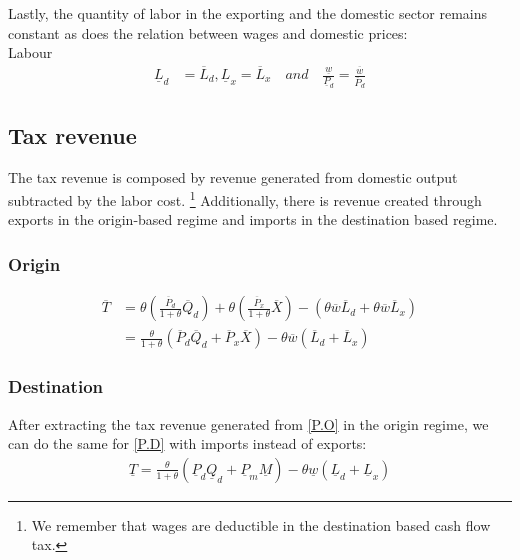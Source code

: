 Lastly, the quantity of labor in the exporting and the domestic sector remains constant as does the relation between wages and domestic prices: \\
\noindent Labour
\begin{equation}\label{P.L}
\begin{aligned}
\underline L_d &= \overline L_d, \underline L_x = \overline L_x \quad and \quad \frac{\underline w}{\underline P_d} = \frac{\overline w}{\overline P_d}
\end{aligned}
\end{equation}

\subsection*{Tax revenue}
The tax revenue is composed by revenue generated from domestic output subtracted by the labor cost. \footnote{We remember that wages are deductible in the destination based cash flow tax.} Additionally, there is revenue created through exports in the origin-based regime and imports in the destination based regime.  
\subsubsection*{Origin} 
\begin{equation}\label{t.o}
\begin{aligned}
\overline T &= \theta \left(\frac{\overline P_d}{1+\theta}\overline Q_d \right ) + \theta \left(\frac{\overline P_x}{1+\theta}\overline X\right ) - \left( \theta \overline w \overline L_d + \theta \overline w \overline L_x\right ) \\ &= \frac{\theta}{1+\theta} \left(  \overline P_d \overline Q_d +  \overline P_x \overline X \right)  - \theta \overline w  \left( \overline L_d + \overline L_x \right) 
\end{aligned} 
\end{equation}

\subsubsection*{Destination}
After extracting the tax revenue generated from \eqref{P.O} in the origin regime, we can do the same for \eqref{P.D} with imports instead of exports: 
\begin{equation}\label{t.d}
\begin{aligned}
\underline T =%
 \frac{\theta}{1+\theta} \left(  \underline P_d \underline Q_d + \underline P_m \underline M   \right) - \theta \underline w  \left( \underline L_d + \underline L_x \right) 
\end{aligned} 
\end{equation}

